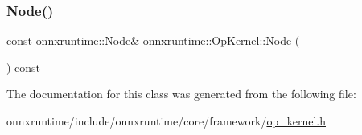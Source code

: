 \mbox{\label{classonnxruntime_1_1OpKernel_a25340750e93643e6f7c6dc959e6b9c35}} 
\subsubsection{\texorpdfstring{Node()}{Node()}}
{\footnotesize\ttfamily const \mbox{\hyperlink{classonnxruntime_1_1Node}{onnxruntime\+::\+Node}}\& onnxruntime\+::\+Op\+Kernel\+::\+Node (\begin{DoxyParamCaption}{ }\end{DoxyParamCaption}) const\hspace{0.3cm}{\ttfamily [inline]}}



The documentation for this class was generated from the following file\+:\begin{DoxyCompactItemize}
\item 
onnxruntime/include/onnxruntime/core/framework/\mbox{\hyperlink{op__kernel_8h}{op\+\_\+kernel.\+h}}\end{DoxyCompactItemize}
